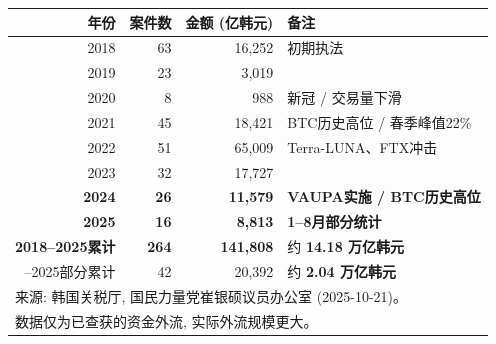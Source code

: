 \begin{tabular}{rrrl}
\toprule
年份 & 案件数 & 金额 (亿韩元) & 备注 \\
\midrule
2018 & 63 & 16,252 & 初期执法 \\
2019 & 23 & 3,019 &  \\
2020 & 8 & 988 & 新冠 / 交易量下滑 \\
2021 & 45 & 18,421 & BTC历史高位 / 春季峰值22\% \\
2022 & 51 & 65,009 & Terra-LUNA、FTX冲击 \\
2023 & 32 & 17,727 &  \\
\textbf{2024} & \textbf{26} & \textbf{11,579} & \textbf{VAUPA实施 / BTC历史高位} \\
\textbf{2025} & \textbf{16} & \textbf{8,813} & \textbf{1--8月部分统计} \\
\midrule
\textbf{2018--2025累计} & \textbf{264} & \textbf{141,808} & 约 \textbf{14.18 万亿韩元} \\
\quad 2024--2025部分累计 & 42 & 20,392 & 约 \textbf{2.04 万亿韩元} \\
\bottomrule
\multicolumn{4}{l}{\footnotesize 来源: 韩国关税厅, 国民力量党崔银硕议员办公室 (2025-10-21)。}\\
\multicolumn{4}{l}{\footnotesize 数据仅为已查获的资金外流, 实际外流规模更大。}\\
\end{tabular}